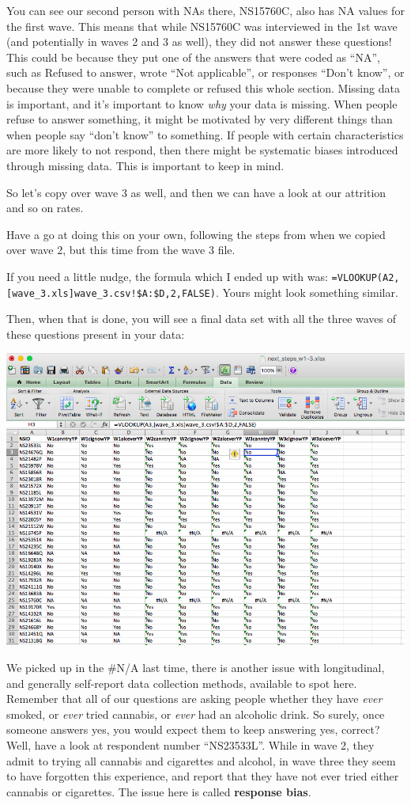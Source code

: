 \documentclass[
]{book}
\begin{document}
You can see our second person with NAs there, NS15760C, also has NA values for the first wave. This means that while NS15760C was interviewed in the 1st wave (and potentially in waves 2 and 3 as well), they did not answer these questions! This could be because they put one of the answers that were coded as ``NA'', such as Refused to answer, wrote ``Not applicable'', or responses ``Don't know'', or because they were unable to complete or refused this whole section. Missing data is important, and it's important to know \emph{why} your data is missing. When people refuse to answer something, it might be motivated by very different things than when people say ``don't know'' to something. If people with certain characteristics are more likely to not respond, then there might be systematic biases introduced through missing data. This is important to keep in mind.

So let's copy over wave 3 as well, and then we can have a look at our attrition and so on rates.

Have a go at doing this on your own, following the steps from when we copied over wave 2, but this time from the wave 3 file.

If you need a little nudge, the formula which I ended up with was: \texttt{=VLOOKUP(A2,{[}wave\_3.xls{]}wave\_3.csv!\$A:\$D,2,FALSE)}. Yours might look something similar.

Then, when that is done, you will see a final data set with all the three waves of these questions present in your data:

\includegraphics{imgs/merged_data_final.png}

We picked up in the \#N/A last time, there is another issue with longitudinal, and generally self-report data collection methods, available to spot here. Remember that all of our questions are asking people whether they have \emph{ever} smoked, or \emph{ever} tried cannabis, or \emph{ever} had an alcoholic drink. So surely, once someone answers yes, you would expect them to keep answering yes, correct? Well, have a look at respondent number ``NS23533L''. While in wave 2, they admit to trying all cannabis and cigarettes and alcohol, in wave three they seem to have forgotten this experience, and report that they have not ever tried either cannabis or cigarettes. The issue here is called \textbf{response bias}.
\end{document}
